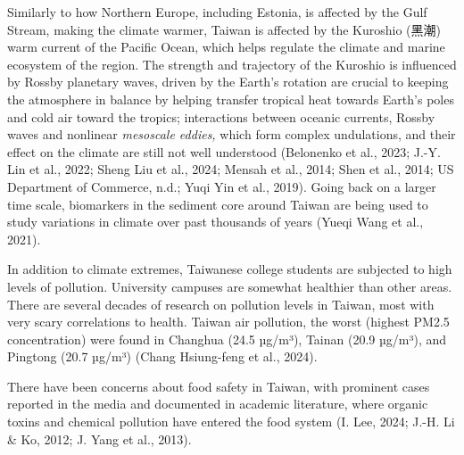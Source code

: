 \documentclass[
  12pt,
  letterpaper,
  DIV=11,
  numbers=noendperiod]{scrartcl}
\begin{document}
Similarly to how Northern Europe, including Estonia, is affected by the
Gulf Stream, making the climate warmer, Taiwan is affected by the
Kuroshio (黑潮) warm current of the Pacific Ocean, which helps regulate
the climate and marine ecosystem of the region. The strength and
trajectory of the Kuroshio is influenced by Rossby planetary waves,
driven by the Earth's rotation are crucial to keeping the atmosphere in
balance by helping transfer tropical heat towards Earth's poles and cold
air toward the tropics; interactions between oceanic currents, Rossby
waves and nonlinear \emph{mesoscale eddies,} which form complex
undulations, and their effect on the climate are still not well
understood (Belonenko et al., 2023; J.-Y. Lin et al., 2022; Sheng Liu et
al., 2024; Mensah et al., 2014; Shen et al., 2014; US Department of
Commerce, n.d.; Yuqi Yin et al., 2019). Going back on a larger time
scale, biomarkers in the sediment core around Taiwan are being used to
study variations in climate over past thousands of years (Yueqi Wang et
al., 2021).

In addition to climate extremes, Taiwanese college students are
subjected to high levels of pollution. University campuses are somewhat
healthier than other areas. There are several decades of research on
pollution levels in Taiwan, most with very scary correlations to health.
Taiwan air pollution, the worst (highest PM2.5 concentration) were found
in Changhua (24.5 µg/m³), Tainan (20.9 µg/m³), and Pingtong (20.7 µg/m³)
(Chang Hsiung-feng et al., 2024).

There have been concerns about food safety in Taiwan, with prominent
cases reported in the media and documented in academic literature, where
organic toxins and chemical pollution have entered the food system (I.
Lee, 2024; J.-H. Li \& Ko, 2012; J. Yang et al., 2013).
\end{document}

